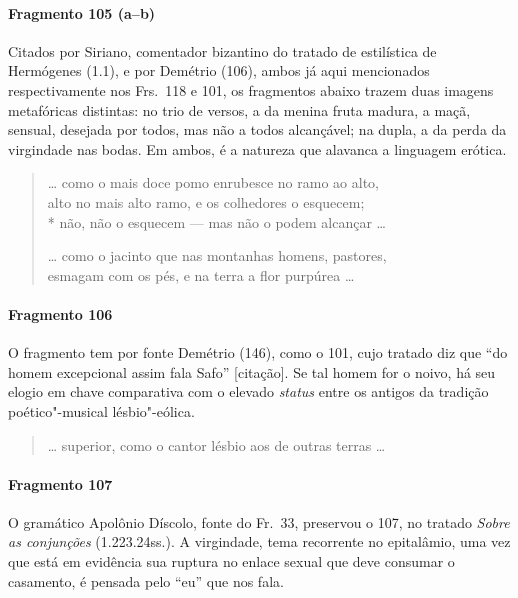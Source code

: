 \paragraph{Fragmento 105 (a--b)}

{\small Citados por Siriano, comentador bizantino do tratado de estilística de
Hermógenes (1.1), e por Demétrio (106), ambos já aqui mencionados respectivamente nos Frs.~118 e 101, os fragmentos abaixo trazem duas imagens metafóricas distintas: no trio de versos, a da menina fruta madura, a maçã, sensual, desejada por todos,
mas não a todos alcançável; na dupla, a da perda da virgindade nas bodas.
Em ambos, é a natureza que alavanca a linguagem erótica.}

\begin{verse}
\ldots{} como o mais doce pomo enrubesce no \qb{}ramo ao alto,\\
alto no mais alto ramo, e os colhedores o \qb{}esquecem;\\*
não, não o esquecem --- mas não o podem \qb{}alcançar \ldots{}

\ldots{} como o jacinto que nas montanhas \qb{}homens, pastores,\\
esmagam com os pés, e na terra a flor \qb{}purpúrea \ldots{}
\end{verse}

\paragraph{Fragmento 106}

{\small O fragmento tem por fonte Demétrio (146), como o 101, cujo tratado diz que
``do homem excepcional assim fala Safo” [citação]. Se tal homem for o
noivo, há seu elogio em chave comparativa com o elevado \textit{status}
entre os antigos da tradição poético"-musical lésbio"-eólica.}

\begin{verse}
\ldots{} superior, como o cantor lésbio aos de \qb{}outras terras \ldots{}
\end{verse}

\paragraph{Fragmento 107}

{\small O gramático Apolônio Díscolo, fonte do Fr.~33, preservou o 107, no tratado
\textit{Sobre as conjunções} (1.223.24ss.). A virgindade, tema recorrente no epitalâmio, uma
vez que está em evidência sua ruptura no enlace sexual que deve consumar o
casamento, é pensada pelo “eu” que nos fala.}

